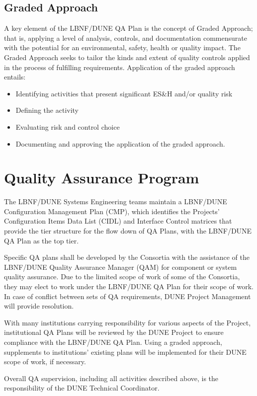\subsection{Graded Approach}

A key element of the LBNF/DUNE QA Plan is the concept of Graded
Approach; that is, applying a level of analysis, controls, and
documentation commensurate with the potential for an environmental,
safety, health or quality impact. The Graded Approach seeks to tailor
the kinds and extent of quality controls applied in the process of
fulfilling requirements. Application of the graded approach entails:
\begin{itemize}
 \item Identifying activities that present significant ES\&H and/or quality risk
 \item Defining the activity
 \item Evaluating risk and control choice
 \item Documenting and approving the application of the graded approach.
\end{itemize}

\section{Quality Assurance Program}

The LBNF/DUNE Systems Engineering teams maintain a LBNF/DUNE
Configuration Management Plan (CMP), which identifies the Projects’
Configuration Items Data List (CIDL) and Interface Control matrices
that provide the tier structure for the flow down of QA Plans, with
the LBNF/DUNE QA Plan as the top tier.

Specific QA plans shall be developed by the Consortia with the
assistance of the LBNF/DUNE Quality Assurance Manager (QAM) for
component or system quality assurance. Due to the limited scope of
work of some of the Consortia, they may elect to work under the
LBNF/DUNE QA Plan for their scope of work. In case of conflict between
sets of QA requirements, DUNE Project Management will provide
resolution.

With many institutions carrying responsibility for various aspects of
the Project, institutional QA Plans will be reviewed by the DUNE
Project to ensure compliance with the LBNF/DUNE QA Plan. Using a
graded approach, supplements to institutions’ existing plans will be
implemented for their DUNE scope of work, if necessary.

Overall QA supervision, including all activities described above, is
the responsibility of the DUNE Technical Coordinator.

